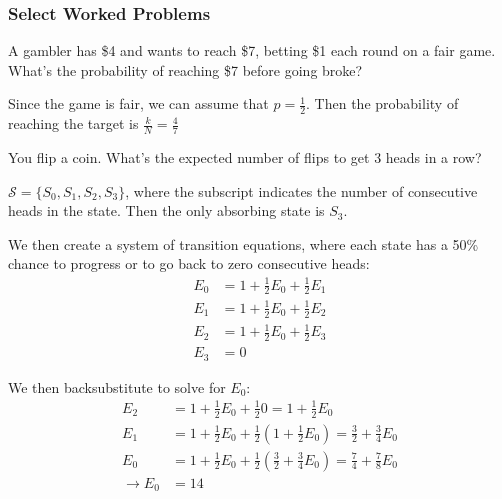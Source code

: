 \subsubsection{Select Worked Problems}

\begin{problem}
A gambler has \$4 and wants to reach \$7, betting \$1 each round on a fair game. What's the probability of reaching \$7 before going broke?
\end{problem}

\begin{solution}
Since the game is fair, we can assume that $p=\frac{1}{2}$. Then the probability of reaching the target is $\frac{k}{N} = \frac{4}{7}$
\end{solution}

\begin{problem}
You flip a coin. What's the expected number of flips to get 3 heads in a row?
\end{problem}

\begin{solution}
$\mathcal{S} = \{S_0, S_1, S_2, S_3\}$, where the subscript indicates the number of consecutive heads in the state. Then the only absorbing state is $S_3$.

We then create a system of transition equations, where each state has a 50\% chance to progress or to go back to zero consecutive heads:
\begin{align*}
    E_0 &=  1 + \frac{1}{2} E_0 + \frac{1}{2}E_1 \\[1ex]
    E_1 &=  1 + \frac{1}{2} E_0 + \frac{1}{2}E_2 \\[1ex]
    E_2 &=  1 + \frac{1}{2} E_0 + \frac{1}{2}E_3 \\[1ex]
    E_3 &= 0
\end{align*}

We then backsubstitute to solve for $E_0$:
\begin{align*}
    E_2 &= 1 + \frac{1}{2}E_0 + \frac{1}{2}0 = 1 + \frac{1}{2}E_0\\[1ex]
    E_1 &= 1 + \frac{1}{2}E_0 + \frac{1}{2} \left ( 1 + \frac{1}{2}E_0 \right) = \frac{3}{2} + \frac{3}{4}E_0\\[1ex]
    E_0 &= 1 + \frac{1}{2}E_0 + \frac{1}{2} \left( \frac{3}{2} + \frac{3}{4}E_0  \right ) = \frac{7}{4} + \frac{7}{8} E_0\\[1ex]
    \rightarrow E_0 &= 14 
\end{align*}
\end{solution}

